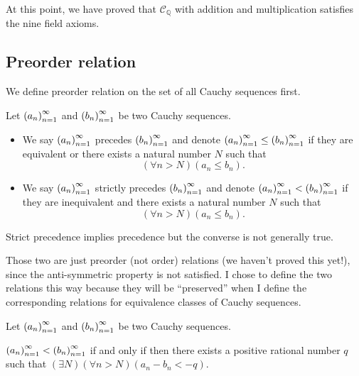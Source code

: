 At this point, we have proved that $\mathscr{C}_{\mathbb{Q}}$ with addition and multiplication satisfies the nine field axioms.

\subsection{Preorder relation}

We define preorder relation on the set of all Cauchy sequences first.

\begin{definition}
    Let ${\left({a_{n}}\right)}^{\infty}_{n=1}$ and ${\left({b_{n}}\right)}^{\infty}_{n=1}$ be two Cauchy sequences.

    \begin{itemize}
        \item We say ${\left({a_{n}}\right)}^{\infty}_{n=1}$ precedes ${\left({b_{n}}\right)}^{\infty}_{n=1}$ and denote ${\left({a_{n}}\right)}^{\infty}_{n=1}\le{\left({b_{n}}\right)}^{\infty}_{n=1}$ if they are equivalent or there exists a natural number $N$ such that
              \[
                  (\forall n > N)(a_{n}\le b_{n}).
              \]
        \item We say ${\left({a_{n}}\right)}^{\infty}_{n=1}$ strictly precedes ${\left({b_{n}}\right)}^{\infty}_{n=1}$ and denote ${\left({a_{n}}\right)}^{\infty}_{n=1} < {\left({b_{n}}\right)}^{\infty}_{n=1}$ if they are inequivalent and there exists a natural number $N$ such that
              \[
                  (\forall n > N)(a_{n}\le b_{n}).
              \]
    \end{itemize}
\end{definition}

Strict precedence implies precedence but the converse is not generally true.

Those two are just preorder (not order) relations (we haven't proved this yet!), since the anti-symmetric property is not satisfied. I chose to define the two relations this way because they will be ``preserved'' when I define the corresponding relations for equivalence classes of Cauchy sequences.

\begin{theorem}\label{theorem:chapter1:inequivalent-sequences}
    Let ${\left({a_{n}}\right)}^{\infty}_{n=1}$ and ${\left({b_{n}}\right)}^{\infty}_{n=1}$ be two Cauchy sequences.

    ${\left({a_{n}}\right)}^{\infty}_{n=1} < {\left({b_{n}}\right)}^{\infty}_{n=1}$ if and only if then there exists a positive rational number $q$ such that $(\exists N)(\forall n > N)(a_{n} - b_{n} < -q)$.
\end{theorem}


